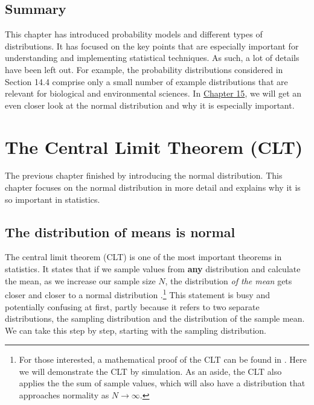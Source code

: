 \documentclass[
]{scrbook}
\begin{document}
\hypertarget{summary-2}{%
\section{Summary}\label{summary-2}}

This chapter has introduced probability models and different types of distributions.
It has focused on the key points that are especially important for understanding and implementing statistical techniques.
As such, a lot of details have been left out.
For example, the probability distributions considered in Section 14.4 comprise only a small number of example distributions that are relevant for biological and environmental sciences.
In \protect\hyperlink{Chapter_15}{Chapter 15}, we will get an even closer look at the normal distribution and why it is especially important.

\hypertarget{Chapter_15}{%
\chapter{The Central Limit Theorem (CLT)}\label{Chapter_15}}

The previous chapter finished by introducing the normal distribution.
This chapter focuses on the normal distribution in more detail and explains why it is so important in statistics.

\hypertarget{the-distribution-of-means-is-normal}{%
\section{The distribution of means is normal}\label{the-distribution-of-means-is-normal}}

The central limit theorem (CLT) is one of the most important theorems in statistics.
It states that if we sample values from \textbf{any} distribution and calculate the mean, as we increase our sample size \(N\), the distribution \emph{of the mean} gets closer and closer to a normal distribution \citep{Sokal1995, Miller2004, Spiegelhalter2019}.\footnote{For those interested, a mathematical proof of the CLT can be found in \citet{Miller2004}. Here we will demonstrate the CLT by simulation. As an aside, the CLT also applies the the sum of sample values, which will also have a distribution that approaches normality as \(N \to \infty\).}
This statement is busy and potentially confusing at first, partly because it refers to two separate distributions, the sampling distribution and the distribution of the sample mean.
We can take this step by step, starting with the sampling distribution.
\end{document}
